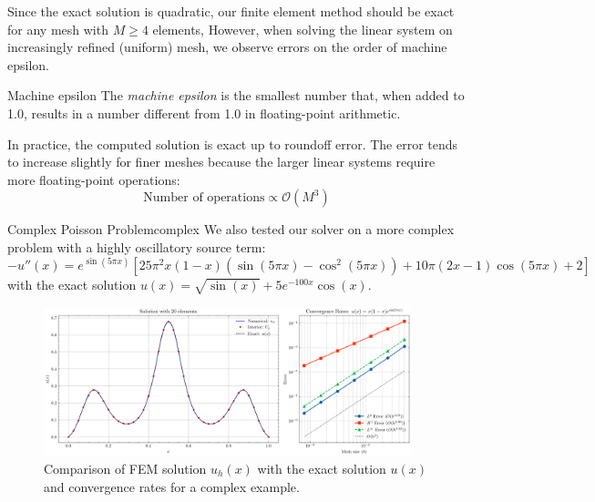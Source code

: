 \documentclass[a4paper,10pt]{article}
\begin{document}
Since the exact solution is quadratic, our finite element method should be exact for any mesh with $M \geq 4$ elements,
However, when solving the linear system on increasingly refined (uniform) mesh, we observe errors on the order of machine epsilon.
\begin{remark}{Machine epsilon}{}
	The \emph{machine epsilon} is the smallest number that, when added to 1.0, results in a number different from 1.0 in floating-point arithmetic.
\end{remark}

In practice, the computed solution is exact up to roundoff error. The error tends to increase slightly for finer meshes because the larger linear systems require more floating-point operations:
\[
	\text{Number of operations} \propto \mathcal{O}(M^3)
\]

\begin{example}{Complex Poisson Problem}{complex}
	We also tested our solver on a more complex problem with a highly oscillatory source term:
	\[
		-u''(x) = e^{\sin(5\pi x)}\left[25\pi^2 x(1-x)(\sin(5\pi x) - \cos^2(5\pi x)) + 10\pi (2x-1)\cos(5\pi x) + 2\right]
	\]
	with the exact solution \(u(x) =\sqrt{\sin(x)} + 5e^{-100x}\cos(x).\)
\end{example}
\begin{figure}[H]
	\centering
	\includegraphics[width=0.95\textwidth]{figures/convergence_complex.png}
	\caption{Comparison of FEM solution \(u_h(x)\) with the exact solution \(u(x)\) and convergence rates for a complex example.}
	\label{fig:solution_complex}
\end{figure}
\end{document}
